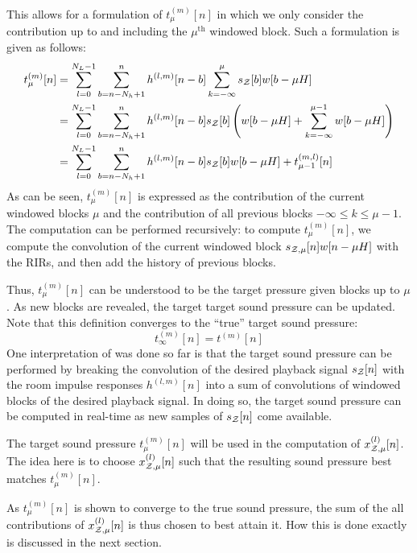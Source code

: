 This allows for a formulation of $t_\mu^{(m)}[n]$ in which we only consider the contribution up to and including the $\mu^\text{th}$ windowed block.  
Such a formulation is given as follows:
\begin{align}
    t_\mu^{(m)}[n] &= \sum_{l=0}^{N_L - 1} \sum_{b = n - N_h + 1}^{n} h^{(l,m)}[n - b] \sum_{k=-\infty}^{\mu} s_{\mathcal{Z}}[b] w[b - \mu H]\\
                   &= \sum_{l=0}^{N_L - 1} \sum_{b = n - N_h + 1}^{n} h^{(l,m)}[n - b] s_{\mathcal{Z}}[b]\left(w[b - \mu H] + \sum_{k=-\infty}^{\mu - 1} w[b - \mu H] \right)\\
                   &= \sum_{l=0}^{N_L - 1} \sum_{b = n - N_h + 1}^{n} h^{(l,m)}[n - b] s_{\mathcal{Z}}[b] w[b - \mu H] + t_{\mu - 1}^{(m,l)}[n]
\end{align}
As can be seen, $t_\mu^{(m)}[n]$ is expressed as the contribution of the current windowed blocks $\mu$ and the contribution of all previous blocks $-\infty \leq k \leq \mu - 1$.
The computation can be performed recursively:
to compute $t_\mu^{(m)}[n]$, we compute the convolution of the current windowed block $s_{\mathcal{Z},\mu}[n]w[n - \mu H]$ with the RIRs, 
and then add the history of previous blocks.

Thus, $t_\mu^{(m)}[n]$ can be understood to be the target pressure given blocks up to $\mu$. 
As new blocks are revealed, the target target sound pressure can be updated.
Note that this definition converges to the ``true'' target sound pressure:
\begin{equation}
    t_\infty^{(m)}[n] = t^{(m)}[n]  
\end{equation}
One interpretation of was done so far is that the target sound pressure can be performed by
breaking the convolution of the desired playback signal $s_{\mathcal{Z}}[n]$ with the room impulse responses $h^{(l,m)}[n]$
into a sum of convolutions of windowed blocks of the desired playback signal.
In doing so, the target sound pressure can be computed in real-time as new samples of $s_{\mathcal{Z}}[n]$ come available.

The target sound pressure $t_\mu^{(m)}[n]$ will be used in the computation of $x^{(l)}_{\mathcal{Z},\mu}[n]$.
The idea here is to choose $x^{(l)}_{\mathcal{Z},\mu}[n]$ such that the resulting sound pressure best matches $t_\mu^{(m)}[n]$.

As $t_\mu^{(m)}[n]$ is shown to converge to the true sound pressure, the sum of the all contributions of $x^{(l)}_{\mathcal{Z},\mu}[n]$ is thus chosen to best attain it. 
How this is done exactly is discussed in the next section.

